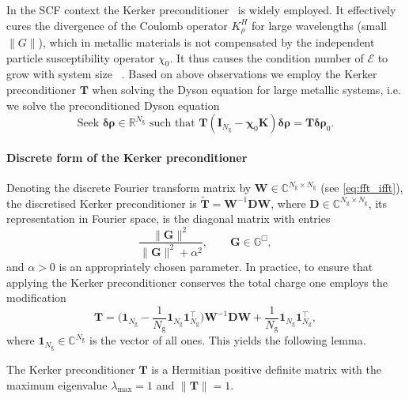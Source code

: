 \documentclass[hidelinks,onefignum,onetabnum]{siamart250211}
\newcommand{\R}{\mathbb{R}}
\newcommand{\C}{\mathbb{C}}
\newcommand{\G}{\mathbb{G}}
\newcommand{\Ng}{N_{\mathrm{g}}}
\begin{document}
In the SCF context the Kerker preconditioner~\cite{kerker1981efficient} is widely employed.
It effectively cures the
divergence of the Coulomb operator $K_\rho^H$ for large wavelengths (small $\|G\|$),
which in metallic materials is not compensated
by the independent particle susceptibility operator $\chi_0$.
It thus causes the condition number of $\mathcal{E}$ to grow with system size%
~\cite{herbstBlackboxInhomogeneousPreconditioning2020}.
Based on above observations we employ the Kerker preconditioner $\bm T$
when solving the Dyson equation for large metallic systems,
i.e. we solve the preconditioned Dyson equation
\begin{equation}\label{eq:precond_dyson}
  \text{Seek } \bm{\delta \rho} \in \R^{\Ng} \text{ such that } \bm T (\bm I_{\Ng} - \bm \chi_0 \bm K) \bm{\delta \rho} = \bm T \bm{\delta \rho}_0.
\end{equation}

\paragraph{Discrete form of the Kerker preconditioner}
%
Denoting the discrete Fourier transform matrix by $\bm W\in\C^{\Ng\times\Ng}$
(see \eqref{eq:fft_ifft}),
the discretised Kerker preconditioner
is $\widetilde{\bm T} = \bm W^{-1} \bm D \bm W$,
where $\bm D \in \C^{\Ng \times \Ng}$, its representation in Fourier space,
is the diagonal matrix with entries
\[
\frac{\|\bm G\|^2}{\|\bm G\|^2 + \alpha^2}, \qquad \bm G\in\G^{\Box},
\]
and $\alpha>0$ is an appropriately chosen parameter.
In practice, to ensure that applying the Kerker preconditioner
conserves the total charge one employs the modification
\begin{equation}\label{eq:kerker}
    \bm T = \Big(\bm 1_{\Ng} - \frac{1}{\Ng} \bm 1_{\Ng} \bm 1_{\Ng}^{\top}\Big)
    \bm W^{-1} \bm D \bm W + \frac{1}{\Ng} \bm 1_{\Ng} \bm 1_{\Ng}^{\top},
\end{equation}
where $\bm 1_{\Ng} \in \C^{\Ng}$ is the vector of all ones.
This yields the following lemma.
%
%
%
%
\begin{lemma}\label{lem:kerker_properties}
  The Kerker preconditioner $\bm T$ is a Hermitian positive definite matrix
  with the maximum eigenvalue $\lambda_{\max} = 1$ and $\| \bm T \| = 1$.
\end{lemma}
\end{document}
